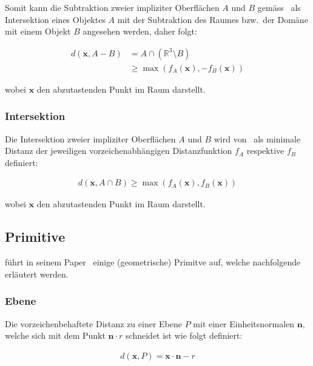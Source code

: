 Somit kann die Subtraktion zweier impliziter Oberflächen $A$ und $B$
gemäss~\cite{hart_sphere_1994} als Intersektion eines Objektes $A$ mit der
Subtraktion des Raumes bzw.\ der Domäne mit einem Objekt $B$ angesehen werden,
daher folgt:

\begin{align}
    d(\bm{x}, A - B) &= A \cap (\mathbb{R}^{3} \setminus B) \\
                     &\geq \max(f_{A}(\bm{x}), -f_{B}(\bm{x}))
\end{align}

wobei $\bm{x}$ den abzutastenden Punkt im Raum darstellt.

\subsubsection{Intersektion}
\label{ssubsec:implicit_surfaces_ops_intersection}

Die Intersektion zweier impliziter Oberflächen $A$ und $B$ wird
von~\cite{hart_sphere_1994} als minimale Distanz der jeweiligen
vorzeichenabhängigen  Distanzfunktion $f_{A}$ respektive $f_{B}$ definiert:

\begin{gather}
    d(\bm{x}, A \cap B) \geq \max(f_{A}(\bm{x}), f_{B}(\bm{x}))
\end{gather}

wobei $\bm{x}$ den abzutastenden Punkt im Raum darstellt.

\subsection{Primitive}
\label{subsec:implicit_surfaces_primitives}

\cite{hart_sphere_1994} führt in seinem Paper~ einige
(geometrische) Primitve auf, welche nachfolgende erläutert werden.

\subsubsection{Ebene}
\label{ssubsec:implicit_surfaces_primitives_plane}

Die vorzeichenbehaftete Distanz zu einer Ebene $P$ mit einer Einheitsnormalen
$\bm{n}$, welche sich mit dem Punkt $\bm{n} \cdot r$ schneidet ist wie folgt
definiert:

\begin{gather}
    d(\bm{x}, P) = \bm{x} \cdot \bm{n} - r
\end{gather}

